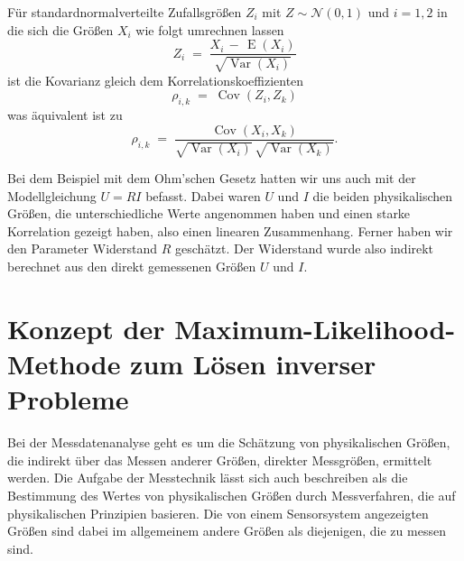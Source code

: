 Für standardnormalverteilte Zufallsgrößen $Z_i$ mit $Z \sim \mathcal{N}(0,1)$ 
und $i = 1,2$ in die sich
die Größen $X_i$ wie folgt umrechnen lassen
\begin{equation}
Z_i \; = \; \frac{X_i \, - \, \operatorname{E}(X_i)}{\sqrt{\operatorname {Var}(X_{i})}}
\end{equation}
ist die Kovarianz gleich dem Korrelationskoeffizienten
\begin{equation}
\rho_{i,k} \; = \; \operatorname {Cov}(Z_{i},Z_{k})
\end{equation}
was äquivalent ist zu
\begin{equation}
\rho_{i,k} \; = \; \frac{\operatorname {Cov}(X_{i},X_{k})}{\sqrt{\operatorname {Var}(X_{i})} \, \sqrt{\operatorname {Var}(X_{k})}} .
\end{equation}

Bei dem Beispiel mit dem Ohm'schen Gesetz hatten wir uns auch mit der Modellgleichung $U = R I$ befasst.
Dabei waren $U$ und $I$ die beiden physikalischen Größen, die unterschiedliche Werte angenommen haben und
einen starke Korrelation gezeigt haben, also einen linearen Zusammenhang. Ferner haben wir den Parameter
Widerstand $R$ geschätzt. Der Widerstand wurde also indirekt berechnet aus den direkt gemessenen Größen
$U$ und $I$. 

\newpage

\section{Konzept der Maximum-Likelihood-Methode zum Lösen inverser Probleme}

Bei der Messdatenanalyse geht es um die Schätzung von physikalischen Größen, die
indirekt über das Messen anderer Größen, direkter Messgrößen, ermittelt werden.
Die Aufgabe der Messtechnik lässt sich auch beschreiben als die Bestimmung
des Wertes von physikalischen Größen durch Messverfahren, die auf physikalischen Prinzipien
basieren. Die von einem Sensorsystem angezeigten Größen sind dabei
im allgemeinem andere Größen als diejenigen, die zu messen sind.

